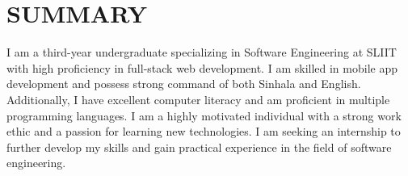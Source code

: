 \section{SUMMARY}

\begin{onecolentry}
   I am a third-year undergraduate specializing in Software Engineering at SLIIT with high proficiency in full-stack web development. I am skilled in mobile app development and possess strong command of both Sinhala and English. Additionally, I have excellent computer literacy and am proficient in multiple programming languages. I am a highly motivated individual with a strong work ethic and a passion for learning new technologies. I am seeking an internship to further develop my skills and gain practical experience in the field of software engineering.
\end{onecolentry}